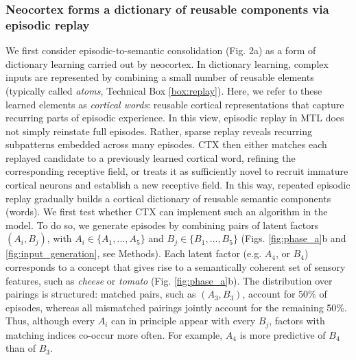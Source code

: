 \documentclass{article}
\begin{document}
\subsubsection*{Neocortex forms a dictionary of reusable components via episodic replay}
We first consider episodic-to-semantic consolidation (Fig. 2a) as a form of dictionary learning carried out by neocortex. In dictionary learning, complex inputs are represented by combining a small number of reusable elements (typically called \textit{atoms}, Technical Box \ref{box:replay}). Here, we refer to these learned elements as \textit{cortical words}: reusable cortical representations that capture recurring parts of episodic experience. In this view, episodic replay in MTL does not simply reinstate full episodes. Rather, sparse replay reveals recurring subpatterns embedded across many episodes. CTX then either matches each replayed candidate to a previously learned cortical word, refining the corresponding receptive field, or treats it as sufficiently novel to recruit immature cortical neurons and establish a new receptive field. In this way, repeated episodic replay gradually builds a cortical dictionary of reusable semantic components (words).
\newline\newline
We first test whether CTX can implement such an algorithm in the model. To do so, we generate episodes by combining pairs of latent factors $(A_i,B_j)$, with $A_i \in \{A_1,\dots,A_5\}$ and $B_j \in \{B_1,\dots,B_5\}$ (Figs. \ref{fig:phase_a}b and \ref{fig:input_generation}, see Methods). Each latent factor (e.g. $A_4$, or $B_4$) corresponds to a concept that gives rise to a semantically coherent set of sensory features, such as \textit{cheese} or \textit{tomato} (Fig. \ref{fig:phase_a}b). The distribution over pairings is structured: matched pairs, such as $(A_3,B_3)$, account for 50\% of episodes, whereas all mismatched pairings jointly account for the remaining 50\%. Thus, although every $A_i$ can in principle appear with every $B_j$, factors with matching indices co-occur more often. For example, $A_4$ is more predictive of $B_4$ than of $B_3$.
\newline\newline
\end{document}
